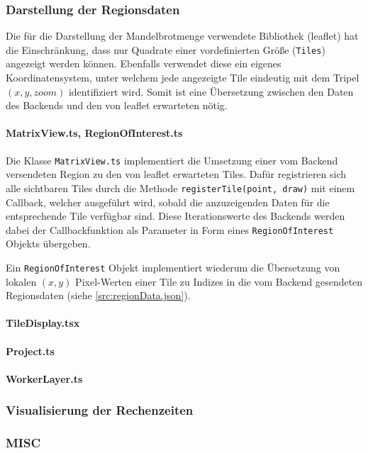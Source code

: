\subsubsection{Darstellung der Regionsdaten} %

Die für die Darstellung der Mandelbrotmenge verwendete Bibliothek (leaflet) hat die Einschränkung, dass 
nur Quadrate einer vordefinierten Größe (\verb|Tiles|) angezeigt werden können. Ebenfalls verwendet diese ein 
eigenes Koordinatensystem, unter welchem jede angezeigte Tile eindeutig mit dem Tripel \( (x, y, zoom) \)
identifiziert wird. Somit ist eine Übersetzung zwischen den Daten des Backends und den von leaflet erwarteten nötig.

\paragraph{MatrixView.ts, RegionOfInterest.ts}
Die Klasse \verb|MatrixView.ts| implementiert die Umsetzung einer vom Backend versendeten Region zu
den von leaflet erwarteten Tiles. Dafür registrieren sich alle sichtbaren Tiles durch die Methode
\verb|registerTile(point, draw)| mit einem Callback, welcher ausgeführt wird, sobald die anzuzeigenden Daten für die 
entsprechende Tile verfügbar sind. Diese Iterationswerte des Backends werden dabei der Callbackfunktion als Parameter
in Form eines \verb|RegionOfInterest| Objekts übergeben. 

Ein \verb|RegionOfInterest| Objekt implementiert wiederum die Übersetzung von lokalen \( (x,y) \) Pixel-Werten
einer Tile zu Indizes in die vom Backend gesendeten Regionsdaten (siehe \autoref{src:regionData.json}).

\begin{figure}[h!]
	
\end{figure}






\paragraph{TileDisplay.tsx}

\paragraph{Project.ts}
\paragraph{WorkerLayer.ts}
\subsubsection{Visualisierung der Rechenzeiten} %

\subsubsection{MISC} %